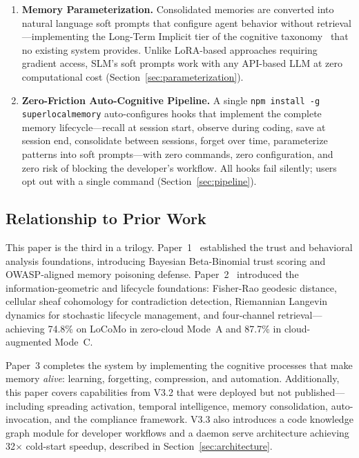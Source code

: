 \begin{enumerate}[leftmargin=*, label=\textbf{C\arabic*}, topsep=4pt, itemsep=2pt]
  \item \textbf{Memory Parameterization.}
  Consolidated memories are converted into natural language soft prompts that configure agent behavior without retrieval---implementing the Long-Term Implicit tier of the cognitive taxonomy~\cite{cognitive-memory-survey} that no existing system provides. Unlike LoRA-based approaches requiring gradient access, SLM's soft prompts work with any API-based LLM at zero computational cost (Section~\ref{sec:parameterization}).

  \item \textbf{Zero-Friction Auto-Cognitive Pipeline.}
  A single \texttt{npm install -g superlocalmemory} auto-configures hooks that implement the complete memory lifecycle---recall at session start, observe during coding, save at session end, consolidate between sessions, forget over time, parameterize patterns into soft prompts---with zero commands, zero configuration, and zero risk of blocking the developer's workflow. All hooks fail silently; users opt out with a single command (Section~\ref{sec:pipeline}).

\end{enumerate}

\subsection{Relationship to Prior Work}

This paper is the third in a trilogy. Paper~1~\cite{slm-paper1} established the trust and behavioral analysis foundations, introducing Bayesian Beta-Binomial trust scoring and OWASP-aligned memory poisoning defense. Paper~2~\cite{slm-paper2} introduced the information-geometric and lifecycle foundations: Fisher-Rao geodesic distance, cellular sheaf cohomology for contradiction detection, Riemannian Langevin dynamics for stochastic lifecycle management, and four-channel retrieval---achieving 74.8\% on LoCoMo in zero-cloud Mode~A and 87.7\% in cloud-augmented Mode~C.

Paper~3 completes the system by implementing the cognitive processes that make memory \emph{alive}: learning, forgetting, compression, and automation. Additionally, this paper covers capabilities from V3.2 that were deployed but not published---including spreading activation, temporal intelligence, memory consolidation, auto-invocation, and the compliance framework. V3.3 also introduces a code knowledge graph module for developer workflows and a daemon serve architecture achieving 32$\times$ cold-start speedup, described in Section~\ref{sec:architecture}.

